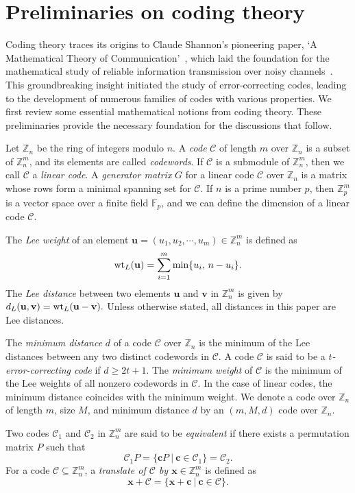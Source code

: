\documentclass{article}
\theoremstyle{definition}
\begin{document}
\section{Preliminaries on coding theory}
Coding theory traces its origins to Claude Shannon's pioneering paper, `A Mathematical Theory of Communication'~\cite{S48}, which laid the foundation for the mathematical study of reliable information transmission over noisy channels~\cite{HP10}. This groundbreaking insight initiated the study of error-correcting codes, leading to the development of numerous families of codes with various properties. We first review some essential mathematical notions from coding theory. These preliminaries provide the necessary foundation for the discussions that follow.

Let $\mathbb{Z}_n$ be the ring of integers modulo $n$. A \textit{code} $\mathcal{C}$  of length $m$ over $\mathbb{Z}_n$ is a subset of $\mathbb{Z}_n^m$, and its elements are called \textit{codewords}. If $\mathcal{C}$ is a submodule of $\mathbb{Z}_n^m$, then we call $\mathcal{C}$ a \textit{linear code}. A \textit{generator matrix} $G$ for a linear code $\mathcal{C}$ over $\mathbb{Z}_n$ is a matrix whose rows form a minimal spanning set for $\mathcal{C}$. If $n$ is a prime number $p$, then $\mathbb{Z}_p^m$ is a vector space over a finite field $\mathbb{F}_p$, and we can define the dimension of a linear code $\mathcal{C}$.

The \textit{Lee weight} of an element $\mathbf{u}=(u_1, u_2, \cdots, u_m)\in\mathbb{Z}_n^m$ is defined as
\[
\textup{wt}_L(\mathbf{u})=\sum_{i=1}^m\min\{u_i,\, n-u_i\}.
\]
The \textit{Lee distance} between two elements $\mathbf{u}$ and $\mathbf{v}$ in $\mathbb{Z}_n^m$ is given by
$
d_{L}(\mathbf{u}, \mathbf{v})=\textup{wt}_L(\mathbf{u}-\mathbf{v}).
$
Unless otherwise stated, all distances in this paper are Lee distances.

The \textit{minimum distance} $d$ of a code $\mathcal{C}$ over $\mathbb{Z}_n$ is the minimum of the Lee distances between any two distinct codewords in $\mathcal{C}$. A code $\mathcal{C}$ is said to be a \textit{$t$-error-correcting code} if $d\ge 2t+1$. The \textit{minimum weight} of $\mathcal{C}$ is the minimum of the Lee weights of all nonzero codewords in $\mathcal{C}$. In the case of linear codes, the minimum distance coincides with the minimum weight. We denote a code over $\mathbb{Z}_n$ of length $m$, size $M$, and minimum distance $d$ by an $(m, M, d)$ code over $\mathbb{Z}_n$.

Two codes $\mathcal{C}_1$ and $\mathcal{C}_2$ in $\mathbb{Z}_n^m$ are said to be \textit{equivalent} if there exists a permutation matrix $P$ such that
\[
\mathcal{C}_1P=\{\textbf{c}P~|~\mathbf{c}\in\mathcal{C}_1\}=\mathcal{C}_2.
\]
For a code $\mathcal{C}\subseteq\mathbb{Z}_n^m$, a \textit{translate of $\mathcal{C}$ by $\mathbf{x}\in\mathbb{Z}_n^m$} is defined as
\[
\mathbf{x}+\mathcal{C}=\{\mathbf{x}+\mathbf{c}~|~\mathbf{c}\in\mathcal{C}\}.
\]
\end{document}
